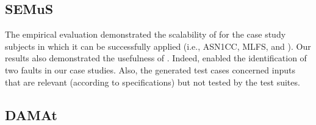 \subsection{SEMuS}

%

The empirical evaluation demonstrated the scalability of \SEMUS for the case study subjects in which it can be successfully applied (i.e., ASN1CC, MLFS, and \UTIL).
Our results also demonstrated the usefulness of \SEMUS. Indeed, \SEMUS enabled the identification of two faults in our case studies. Also, the generated test cases concerned inputs that are relevant (according to specifications) but not tested by the test suites.

%



\subsection{DAMAt}

